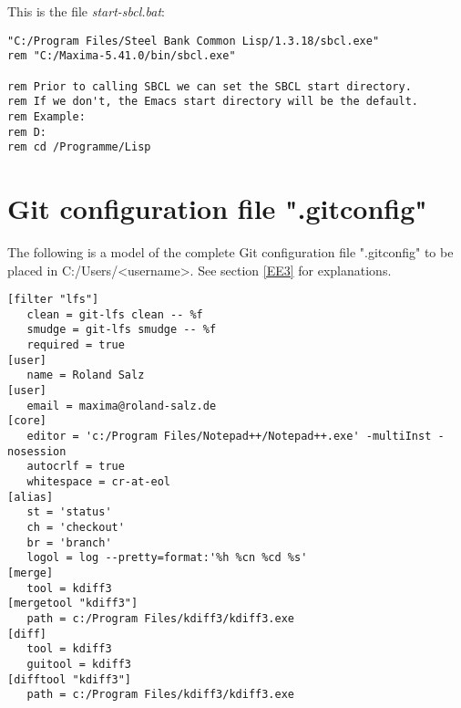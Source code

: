 \documentclass[../Maxima_Workbook.tex]{subfiles}
\begin{document}
\lzzz This is the file \emph{start-sbcl.bat}:

\begin{lstlisting}[style=smallblue]
"C:/Program Files/Steel Bank Common Lisp/1.3.18/sbcl.exe"
rem "C:/Maxima-5.41.0/bin/sbcl.exe"

rem Prior to calling SBCL we can set the SBCL start directory.
rem If we don't, the Emacs start directory will be the default.
rem Example:
rem D:
rem cd /Programme/Lisp
\end{lstlisting}

\chapter{Git configuration file ".gitconfig"}\label{AA3}

The following is a model of the complete Git configuration file ".gitconfig" to be placed in C:/Users/<username>. See section \ref{EE3} for explanations.

\begin{lstlisting}[style=smallblue]
[filter "lfs"]
   clean = git-lfs clean -- %f
   smudge = git-lfs smudge -- %f
   required = true
[user]
   name = Roland Salz
[user]
   email = maxima@roland-salz.de
[core]
   editor = 'c:/Program Files/Notepad++/Notepad++.exe' -multiInst -nosession
   autocrlf = true
   whitespace = cr-at-eol
[alias]
   st = 'status'
   ch = 'checkout'
   br = 'branch'
   logol = log --pretty=format:'%h %cn %cd %s'
[merge]
   tool = kdiff3
[mergetool "kdiff3"]
   path = c:/Program Files/kdiff3/kdiff3.exe
[diff]
   tool = kdiff3
   guitool = kdiff3
[difftool "kdiff3"]
   path = c:/Program Files/kdiff3/kdiff3.exe
\end{lstlisting}
\end{document}
